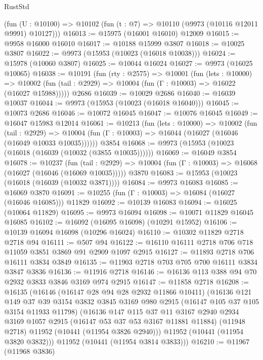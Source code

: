 \begin{lexlean}{RustStd}
\begin{coremodule}
    (fun (U : @10100) => @10102 (fun (t : @7) => @10110 (@9973 (@10116 @12011 @9991) @10127)))
@16013 := @15975 (@16001 @16010) @12009
@16015 := @9958 @16000 @16010
@16017 := @10188 @15999 @3807
@16018 := @10025 @3807
@16022 := @9973 (@15953 (@10023 (@16018 @10038)))
@16024 := @15978 (@10060 @3807)
@16025 := @10044 @16024
@16027 := @9973 (@16025 @10065)
@16038 := @10191
    (fun (rty : @2575) =>
    @10001
      (fun (lets : @10000) =>
      @10002 (fun (tail : @2929) => @10004 (fun (Γ : @10003) => @16022 (@16027 @15988)))))
    @2686
@16039 := @10029 @2686
@16040 := @16039 @10037
@16044 := @9973 (@15953 (@10023 (@16018 @16040)))
@16045 := @10073 @2686
@16046 := @10072 @16045
@16047 := @10076 @16045
@16049 := @16047 @15983 @12014
@16061 := @10213
    (fun (lets : @10000) =>
    @10002
      (fun (tail : @2929) =>
      @10004 (fun (Γ : @10003) => @16044 (@16027 (@16046 (@16049 @10033 @10035))))))
    @3854
@16068 := @9973 (@15953 (@10023 (@16018 (@16039 (@10032 (@3855 @10035))))))
@16069 := @16049 @3854
@16078 := @10237
    (fun (tail : @2929) => @10004 (fun (Γ : @10003) => @16068 (@16027 (@16046 (@16069 @10035)))))
    @3870
@16083 := @15953 (@10023 (@16018 (@16039 (@10032 @3871))))
@16084 := @9973 @16083
@16085 := @16069 @3870
@16091 := @10255 (fun (Γ : @10003) => @16084 (@16027 (@16046 @16085))) @11829
@16092 := @10139 @16083
@16094 := @16025 (@10064 @11829)
@16095 := @9973 @16094
@16098 := @10071 @11829 @16045 @16085
@16102 := @16092 (@16095 @16098) (@10291 @15952)
@16106 := @10139 @16094 @16098 (@10296 @16024)
@16110 := @10302 @11829 @2718 @2718 @94
@16111 := @507 @94
@16122 := @16110 @16111 @2718 @706 @718 @11059 @3851 @3869 @91 @2909 @1097 @2915
@16127 := @11893 @2718 @706 @16111 @3834 @3849
@16135 := @11903 @2718 @703 @705 @700 @16111 @3834 @3847 @3836
@16136 := @11916 @2718
@16146 := @16136 @113 @388 @94 @70 @2932 @3833 @3846 @3169 @974 @2915
@16147 := @11858 @2718
@16208 := @16135
    (@16146
      (@16147 @28 @94 @28 @2932 @11866 @10411)
      (@16136
        @121
        @149
        @37
        @39
        @3154
        @3832
        @3845
        @3169
        @980
        @2915
        (@16147 @105 @37 @105 @3154 @11933 @11798)
        (@16136
          @147
          @115
          @37
          @11
          @3167
          @2940
          @2934
          @3169
          @1057
          @2915
          (@16147 @53 @37 @53 @3167 @11881 @11884)
          (@11948 @2718)
          @11952
          (@10441 (@11954 @3826 @2940)))
        @11952
        (@10441 (@11954 @3820 @3832)))
      @11952
      (@10441 (@11954 @3814 @3833)))
@16210 := @11967 (@11968 @3836)

\end{coremodule}
\end{lexlean}
